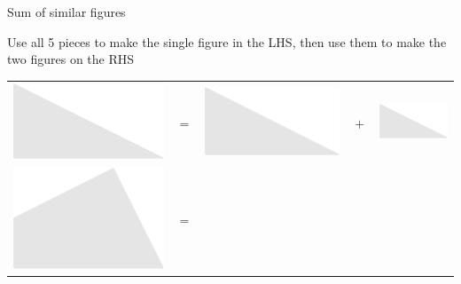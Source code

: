 \documentclass[14pt]{beamer}
\begin{document}

    \begin{frame}{Sum of similar figures}
        \begin{center}
            Use all 5 pieces to make the single figure in the LHS,
            then use them to make the two figures on the RHS

            \bigskip\bigskip

            {\Huge \begin{tabular}{ccccc}
                \includegraphics[scale=0.35]{figures/figure025a.pdf} & $=$ &
                \includegraphics[scale=0.35]{figures/figure025b.pdf} & $\!+\!$ &
                \includegraphics[scale=0.35]{figures/figure025c.pdf}\\[1ex]
                \includegraphics[scale=0.35]{figures/figure025d.pdf} & $=$ &

\end{tabular}}
\end{center}
\end{frame}
\end{document}

